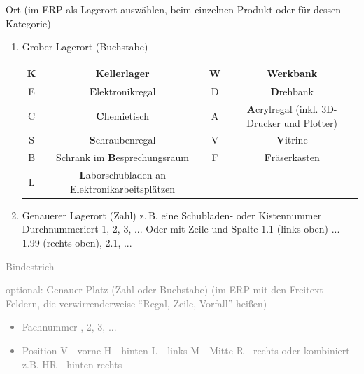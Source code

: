 \documentclass{\basedir/fablab-document}
\begin{document}
\begin{enumerate}
\item Ort (im ERP als Lagerort auswählen, beim einzelnen Produkt oder für dessen Kategorie)
\begin{enumerate}
\item Grober Lagerort (Buchstabe)
	
	\begin{tabular}{c|c|c|c}
	\hline
	K & \textbf{K}ellerlager & W & \textbf{W}erkbank \\
	\hline
	E & \textbf{E}lektronikregal & D & \textbf{D}rehbank \\
	\hline
	C & \textbf{C}hemietisch & A & \textbf{A}crylregal (inkl. 3D-Drucker und Plotter) \\
	\hline
	S & \textbf{S}chraubenregal & V & \textbf{V}itrine \\
	\hline
	B & Schrank im \textbf{B}esprechungsraum & F & \textbf{F}räserkasten \\
	\hline
	L & \textbf{L}aborschubladen an Elektronikarbeitsplätzen & & \\
	\hline
	\end{tabular}
\item Genauerer Lagerort (Zahl) \newline
	z.\,B. eine Schubladen- oder Kistennummer\newline
    Durchnummeriert 1, 2, 3, ...\newline
Oder mit Zeile und Spalte 1.1 (links oben) ... 1.99 (rechts oben), 2.1, ...
\end{enumerate}
\textcolor{gray}{
\item    Bindestrich --
\item   optional: Genauer Platz (Zahl oder Buchstabe) (im ERP mit den Freitext-Feldern, die verwirrenderweise \enquote{Regal, Zeile, Vorfall} heißen)
	\begin{itemize}
	\item Fachnummer , 2, 3, ...
	\item Position\newline
    V - vorne\newline
    H - hinten\newline
    L - links\newline
    M - Mitte\newline
    R - rechts \newline
    oder kombiniert z.B. HR - hinten rechts\newline
	\end{itemize}
}
\end{enumerate}
\end{document}
